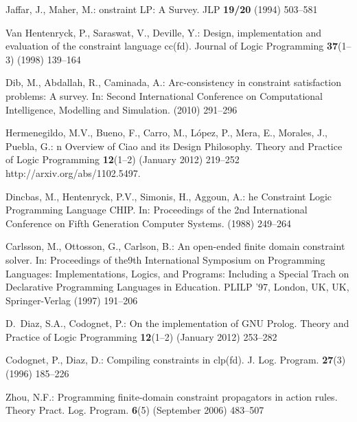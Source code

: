 \documentclass{llncs}
\begin{document}
\begin{thebibliography}{10}

Jaffar, J., Maher, M.:
onstraint {LP}: {A} {S}urvey.
\newblock JLP \textbf{19/20} (1994)  503--581

{Van Hentenryck, P.}, Saraswat, V., Deville, Y.:
\newblock Design, implementation and evaluation of the constraint language
  cc(fd).
\newblock Journal of Logic Programming \textbf{37}(1--3) (1998)  139--164

Dib, M., Abdallah, R., Caminada, A.:
\newblock Arc-consistency in constraint satisfaction problems: A survey.
\newblock In: Second International Conference on Computational Intelligence,
  Modelling and Simulation. (2010)  291--296

Hermenegildo, M.V., Bueno, F., Carro, M., L\'{o}pez, P., Mera, E., Morales, J.,
  Puebla, G.:
n {O}verview of {C}iao and its {D}esign {P}hilosophy.
\newblock Theory and Practice of Logic Programming \textbf{12}(1--2) (January
  2012)  219--252 http://arxiv.org/abs/1102.5497.

Dincbas, M., Hentenryck, P.V., Simonis, H., Aggoun, A.:
he {C}onstraint {L}ogic {P}rogramming {L}anguage {CHIP}.
\newblock In: Proceedings of the 2nd International Conference on Fifth
  Generation Computer Systems. (1988)  249--264

Carlsson, M., Ottosson, G., Carlson, B.:
\newblock An open-ended finite domain constraint solver.
\newblock In: Proceedings of the9th International Symposium on Programming
  Languages: Implementations, Logics, and Programs: Including a Special Trach
  on Declarative Programming Languages in Education. PLILP '97, London, UK, UK,
  Springer-Verlag (1997)  191--206

D.~Diaz, S.A., Codognet, P.:
\newblock On the implementation of {GNU} {P}rolog.
\newblock Theory and Practice of Logic Programming \textbf{12}(1--2) (January
  2012)  253--282

Codognet, P., Diaz, D.:
\newblock Compiling constraints in clp(fd).
\newblock J. Log. Program. \textbf{27}(3) (1996)  185--226

Zhou, N.F.:
\newblock Programming finite-domain constraint propagators in action rules.
\newblock Theory Pract. Log. Program. \textbf{6}(5) (September 2006)  483--507


\end{thebibliography}
\end{document}
